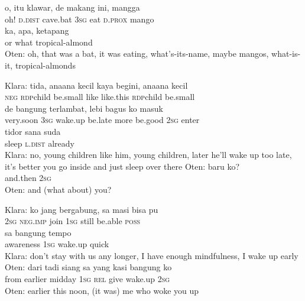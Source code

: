 \ea
{}    {o,}   itu   klawar,   de   makang   ini,   mangga\\
   {}    {oh!}   \textsc{d.dist}   cave.bat   \textsc{3sg}   eat   \textsc{d.prox}   mango\\
\gll  ka,    {apa,}    {ketapang}\\
  or    {what}    {tropical-almond}\\
\glt
Oten: oh, that was a bat, it was eating, what’s-its-name, maybe mangos, what-is-it, tropical-almonds
\z

\ea
\gll   Klara:    {tida,}    {ana{\Tilde}ana}    {kecil}    {kaya}    {begini,}    {ana{\Tilde}ana}   kecil\\
 {}     {\textsc{neg}}    {\textsc{rdp}{\Tilde}child}    {be.small}    {like}    {like.this}    {\textsc{rdp}{\Tilde}child}   be.small\\
    {de}    {bangung}    {terlambat,}    {lebi}    {bagus}   ko    {masuk}\\
   {very.soon}    {\textsc{3sg}}    {wake.up}    {be.late}    {more}    {be.good}   \textsc{2sg}    {enter}\\
 \gll tidor    {sana}    {suda}\\
  sleep    {\textsc{l.dist}}    {already}\\
\glt
Klara: no, young children like him, young children, later he’ll wake up too late, it’s better you go inside and just sleep over there
\z
\ea
\gll   Oten:   baru   ko?\\
 {}    and.then   \textsc{2sg}\\
\glt
Oten: and (what about) you?
\z

\ea
\gll   Klara:   ko    {jang}    {bergabung,}   sa   masi   bisa   pu\\
{}  \textsc{2sg}    {\textsc{neg.imp}}    {join}   \textsc{1sg}   still   be.able   \textsc{poss}\\
   sa    {bangung}    {tempo}\\
   {awareness}   \textsc{1sg}    {wake.up}    {quick}\\
\glt
Klara: don’t stay with us any longer, I have enough mindfulness, I wake up early
\z
\ea
\gll   Oten:   dari   tadi   siang   sa   yang   kasi   bangung   ko\\
{}     from   earlier   midday   \textsc{1sg}   \textsc{rel}   give   wake.up   \textsc{2sg}\\
\glt
Oten: earlier this noon, (it was) me who woke you up
\z


